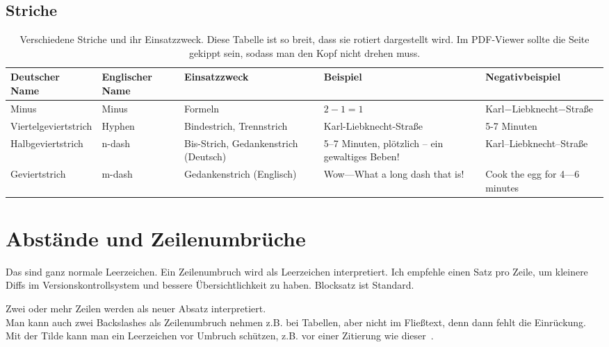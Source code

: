 \begin{landscape}

\section{Striche}

\begin{table}[h]
\begin{tabulary}{\textheight}{LLLLL}
\toprule
Deutscher Name				&Englischer Name	&Einsatzzweck							&Beispiel													&Negativbeispiel\\
\midrule
Minus						&Minus				&Formeln								&$2-1=1$													&Karl$-$Liebknecht$-$Straße\\
Viertelgeviertstrich		&Hyphen				&Bindestrich, Trennstrich				&Karl-Liebknecht-Straße										&5-7 Minuten\\
Halbgeviertstrich			&n-dash				&Bis-Strich, Gedankenstrich (Deutsch)	&5--7 Minuten, plötzlich -- ein gewaltiges Beben! 			&Karl--Liebknecht--Straße\\%
Geviertstrich				&m-dash				&Gedankenstrich (Englisch)				&Wow---What a long dash that is!							&Cook the egg for 4---6 minutes\\
\bottomrule
\end{tabulary}
\caption{Verschiedene Striche und ihr Einsatzzweck. Diese Tabelle ist so breit, dass sie rotiert dargestellt wird. Im PDF-Viewer sollte die Seite gekippt sein, sodass man den Kopf nicht drehen muss.}
\label{tab:dashes}
\end{table}

\end{landscape}


\section{Abstände und Zeilenumbrüche}
Das sind ganz normale Leerzeichen.
Ein Zeilenumbruch wird als Leerzeichen interpretiert.
Ich empfehle einen Satz pro Zeile, um kleinere Diffs im Versionskontrollsystem und bessere Übersichtlichkeit zu haben.
Blocksatz ist Standard.



Zwei oder mehr Zeilen werden als neuer Absatz interpretiert.\\
Man kann auch zwei Backslashes als Zeilenumbruch nehmen z.B. bei Tabellen, aber nicht im Fließtext, denn dann fehlt die Einrückung.
Mit der Tilde kann man ein Leerzeichen vor Umbruch schützen, z.B. vor einer Zitierung wie dieser~\citep{sniktec}.


